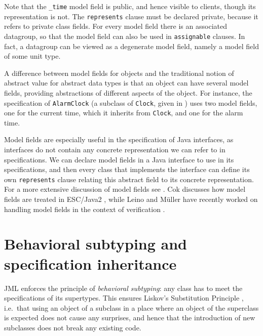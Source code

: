 \documentclass{llncs}
\begin{document}
Note that the \texttt{\_time} model field is public, and hence visible to
clients, though its representation is not.  The \texttt{represents} clause
must be declared private, because it refers to private class fields.
%
For every model field there is an associated datagroup, so that the 
model field can also be used in \texttt{assignable} clauses.
In fact, a datagroup can be viewed as a degenerate model field, namely
a model field of some unit type.

A difference between model fields for objects and the traditional notion of
abstract value for abstract data types is that an object can have several
model fields, providing abstractions of different aspects of the object.
For instance, the specification of \texttt{AlarmClock}
(a subclass of \texttt{Clock}, given in ) uses 
two model fields, one for the current time, which it inherits from
\texttt{Clock}, and one for the alarm time.

Model fields are especially useful in the specification of Java interfaces,
as interfaces do not contain any concrete representation we can refer
to in specifications. We can declare model fields in a Java interface
to use in its specifications, and then every class that implements 
the interface can define its own \texttt{represents} clause relating
this abstract field to its concrete representation. 
%
%
For a more extensive discussion of model fields see \cite{Cheon-etal05}.
Cok discusses how model fields are treated in ESC/Java2 \cite{Cok05}, while
Leino and M\"{u}ller have recently worked on handling model fields in the
context of verification \cite{LeinoMuller06}.

\section{Behavioral subtyping and specification inheritance}
\label{Sec:behsubtyping}

JML enforces the principle of \emph{behavioral subtyping}: any class
has to meet the specifications of its supertypes.
This ensures Liskov's Substitution Principle \cite{LiskovWing94},
i.e.\ that using an object of a subclass in a place where an object of 
the superclass is expected does not cause any surprises, and hence that 
the introduction of new subclasses does not break any existing code.
\end{document}
